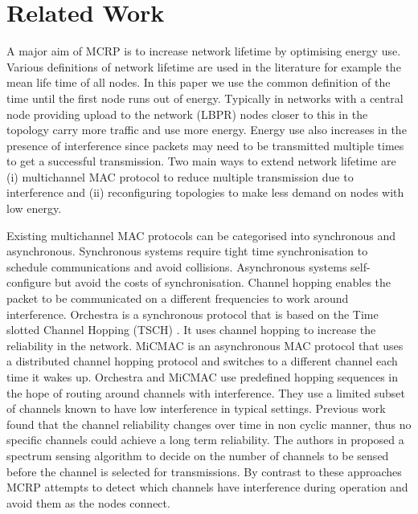 \section{Related Work}
\label{RelatedWork}

 A major aim of MCRP is to increase network lifetime by optimising energy use.  Various definitions of network lifetime are used in the literature for example the mean life time of all nodes.  In this paper we use the common definition of the time until the first node runs out of energy.  Typically in networks with a central node providing upload to the network (LBPR) nodes closer to this in the topology carry more traffic and use more energy.  Energy use also increases in the presence of interference since packets may need to be transmitted multiple times to get a successful transmission. Two main ways to extend network lifetime are (i) multichannel MAC protocol to reduce multiple transmission due to interference and (ii) reconfiguring topologies to make less demand on nodes with low energy.

Existing multichannel MAC protocols can be categorised into synchronous and asynchronous. Synchronous systems require tight time synchronisation to schedule communications and avoid collisions. Asynchronous systems self-configure but avoid the costs of synchronisation.
Channel hopping enables the packet to be communicated on a different frequencies to work around interference.  Orchestra \cite{orchestra} is a synchronous protocol that is based on the Time slotted Channel Hopping (TSCH) \cite{tsch}. It uses channel hopping to increase the reliability in the network.  MiCMAC \cite{micmac} is an asynchronous MAC protocol that uses a distributed channel hopping protocol and switches to a different channel each time it wakes up.  Orchestra and MiCMAC use predefined hopping sequences in the hope of routing around channels with interference.  They use a limited subset of channels known to have low interference in typical settings. Previous work~\cite{homearea,oppcast} found that the channel reliability changes over time in non cyclic manner, thus no specific channels could achieve a long term reliability. The authors in \cite{energyluca} proposed a spectrum sensing algorithm to decide on the number of channels to be sensed before the channel is selected for transmissions.  By contrast to these approaches MCRP attempts to detect which channels have interference during operation and avoid them as the nodes connect.

